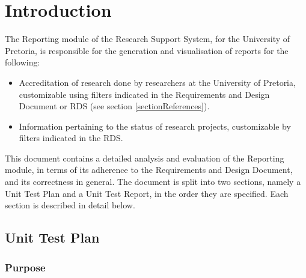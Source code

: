 \section{Introduction}
The Reporting module of the Research Support System, for the University of Pretoria, is responsible for the generation and visualisation of reports for the following:
\begin{itemize}
	\item Accreditation of research done by researchers at the University of Pretoria, customizable using filters indicated in the Requirements and Design Document or RDS (see section \ref{sectionReferences}).
	\item Information pertaining to the status of research projects, customizable by filters indicated in the RDS.
\end{itemize}

This document contains a detailed analysis and evaluation of the Reporting module, in terms of its adherence to the Requirements and Design Document, and its correctness in general. 
The document is split into two sections, namely a Unit Test Plan and a Unit Test Report, in the order they are specified. Each section is described in detail below.

\subsection{Unit Test Plan} 


\subsubsection{Purpose}

